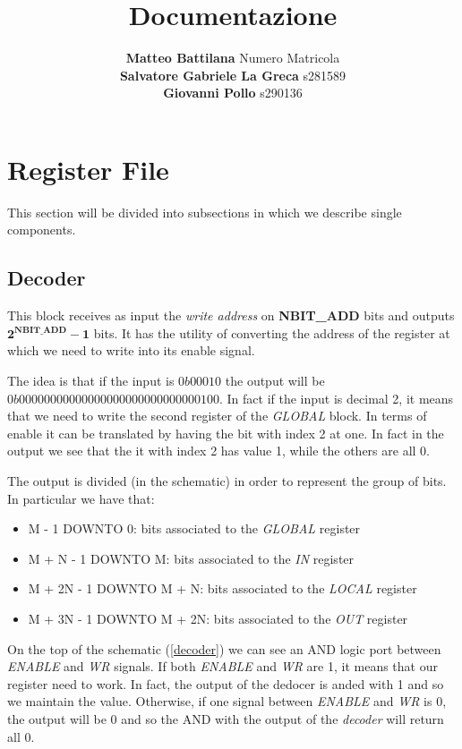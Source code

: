 \documentclass{article}
\title{\huge Documentazione}
\author{
\Large \textbf{Matteo Battilana} Numero Matricola \\
\Large \textbf{Salvatore Gabriele La Greca} s281589 \\
\Large \textbf{Giovanni Pollo} s290136}
\date{}
\begin{document}
\begin{titlepage}
  \centering
  \vspace{2px}
\end{titlepage}
\maketitle

\newpage

\tableofcontents

\newpage

\section{Register File}

This section will be divided into subsections in which we describe single components.

\subsection{Decoder}

This block receives as input the \emph{write address} on \textbf{NBIT\_ADD} bits and outputs \(\mathbf{2^{NBIT\_ADD} - 1} \) bits. It has the utility of converting the address of the register at which we need to write into its enable signal. 

The idea is that if the input is \(0b00010\) the output will be \(0b00000000000000000000000000000100\). In fact if the input is decimal 2, it means that we need to write the second register of the \emph{GLOBAL} block. In terms of enable it can be translated by having the bit with index 2 at one. In fact in the output we see that the it with index 2 has value 1, while the others are all 0. 

The output is divided (in the schematic) in order to represent the group of bits. In particular we have that: 
\begin{itemize}
    \item M - 1 DOWNTO 0: bits associated to the \emph{GLOBAL} register
    \item M + N - 1 DOWNTO M: bits associated to the \emph{IN} register
    \item M + 2N - 1 DOWNTO M + N: bits associated to the \emph{LOCAL} register
    \item M + 3N - 1 DOWNTO M + 2N: bits associated to the \emph{OUT} register
\end{itemize}

On the top of the schematic (\autoref{decoder}) we can see an AND logic port between \emph{ENABLE} and \emph{WR} signals. If both \emph{ENABLE} and \emph{WR} are 1, it means that our register need to work. In fact, the output of the dedocer is anded with 1 and so we maintain the value. Otherwise, if one signal between \emph{ENABLE} and \emph{WR} is 0, the output will be 0 and so the AND with the output of the \emph{decoder} will return all 0. 
\end{document}

